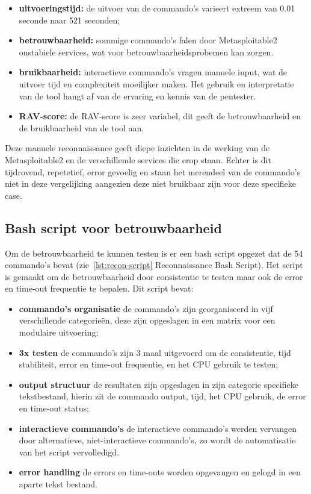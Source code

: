 \begin{itemize}
  \item \textbf{uitvoeringstijd:} de uitvoer van de commando's varieert extreem van 0.01 seconde naar 521 seconden;
  \item \textbf{betrouwbaarheid:} sommige commando's falen door Metasploitable2 onstabiele services, wat voor betrouwbaarheidsprobemen kan zorgen.
  \item \textbf{bruikbaarheid:} interactieve commando's vragen manuele input, wat de uitvoer tijd en complexiteit moeilijker maken. Het gebruik en interpretatie van de tool hangt af van de ervaring en kennis van de pentester.
  \item \textbf{RAV-score:} de RAV-score is zeer variabel, dit geeft de betrouwbaarheid en de bruikbaarheid van de tool aan.

\end{itemize}

Deze manuele reconnaissance geeft diepe inzichten in de werking van de Metasploitable2 en de verschillende services die erop staan.
Echter is dit tijdrovend, repetetief, error gevoelig en staan het merendeel van de commando's niet in deze vergelijking aangezien deze niet bruikbaar zijn voor deze specifieke case.

\subsection{Bash script voor betrouwbaarheid}

Om de betrouwbaarheid te kunnen testen is er een bash script opgezet dat de 54 commando's bevat (zie~\ref{lst:recon-script} Reconnaissance Bash Script). Het script is gemaakt om de betrouwbaarheid door consistentie te testen maar ook de error en time-out frequentie te bepalen.
Dit script bevat:

\begin{itemize}
  \item \textbf{commando's organisatie} de commando's zijn georganiseerd in vijf verschillende categorieën, deze zijn opgeslagen in een matrix voor een modulaire uitvoering;
  \item \textbf{3x testen} de commando's zijn 3 maal uitgevoerd om de consistentie, tijd stabiliteit, error en time-out frequentie, en het CPU gebruik te testen;
  \item \textbf{output structuur} de resultaten zijn opgeslagen in zijn categorie specifieke tekstbestand, hierin zit de commando output, tijd, het CPU gebruik, de error en time-out status;
  \item \textbf{interactieve commando's} de interactieve commando's werden vervangen door alternatieve, niet-interactieve commando's, zo wordt de automatisatie van het script vervolledigd. 
  \item \textbf{error handling} de errors en time-outs worden opgevangen en gelogd in een aparte tekst bestand.

\end{itemize}

